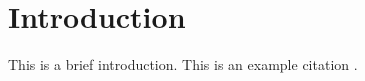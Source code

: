 \documentclass[../main.tex]{subfiles} %
\begin{document}
\section{Introduction}
This is a brief introduction. This is an example citation \cite{example_ref}.

% 	
\end{document}
